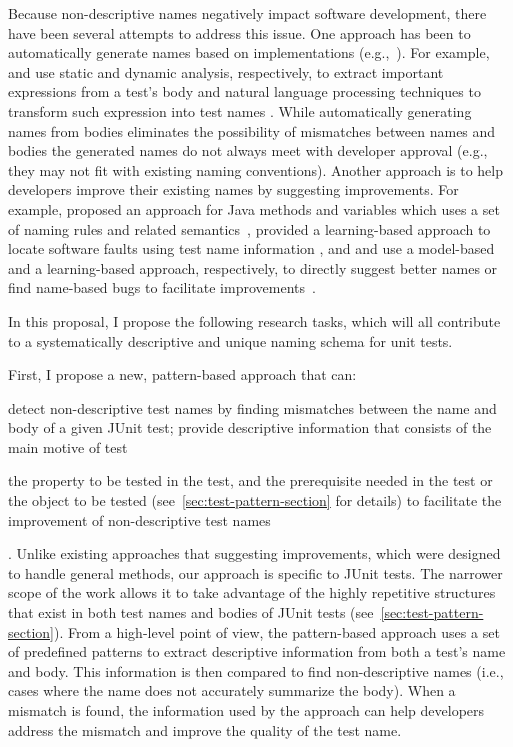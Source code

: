 Because non-descriptive names negatively impact software development, there have been several attempts to address this issue.
%
One approach has been to automatically generate names based on implementations (e.g.,~\cite{arcuri2014automated, zhang2015automatically, daka2017generating}).
%
For example, \citeauthor{zhang2015automatically} and \citeauthor{daka2017generating} use static and dynamic analysis, respectively, to extract important expressions from a test's body and natural language processing techniques to transform such expression into test names \cite{zhang2015automatically, daka2017generating}. 
%
While automatically generating names from bodies eliminates the possibility of mismatches between names and bodies the generated names do not always meet with developer approval (e.g., they may not fit with existing naming conventions).
%
Another approach is to help developers improve their existing names by suggesting improvements.
%
For example, \citeauthor{host2009debugging} proposed an approach for Java methods and variables which uses a set of naming rules and related semantics~\cite{host2009debugging}, \citeauthor{li2019deepfl} provided a learning-based approach to locate software faults using test name information \cite{li2019deepfl}, and \citeauthor{allamanis2015suggesting} and \citeauthor{pradel2018deepbugs} use a model-based and a learning-based approach, respectively, to directly suggest better names or find name-based bugs to facilitate improvements~\cite{allamanis2015suggesting, pradel2018deepbugs}.

In this proposal, I propose the following research tasks, which will all contribute to a systematically descriptive and unique naming schema for unit tests.

First, I propose a new, pattern-based approach that can:
\begin{enumerate*}
\item detect non-descriptive test names by finding mismatches between the name and body of a given JUnit test; provide descriptive information that consists of the main motive of test
\item the property to be tested in the test, and the prerequisite needed in the test or the object to be tested (see~\cref{sec:test-pattern-section} for details) to facilitate the improvement of non-descriptive test names
\end{enumerate*}.
%
Unlike existing approaches that suggesting improvements, which were designed to handle general methods, our approach is specific to JUnit tests.
%
The narrower scope of the work allows it to take advantage of the highly repetitive structures that exist in both test names and bodies of JUnit tests (see~\cref{sec:test-pattern-section}).
%
From a high-level point of view, the pattern-based approach uses a set of predefined patterns to extract descriptive information from both a test's name and body.
%
This information is then compared to find non-descriptive names (i.e., cases where the name does not accurately summarize the body).
%
When a mismatch is found, the information used by the approach can help developers address the mismatch and improve the quality of the test name.


